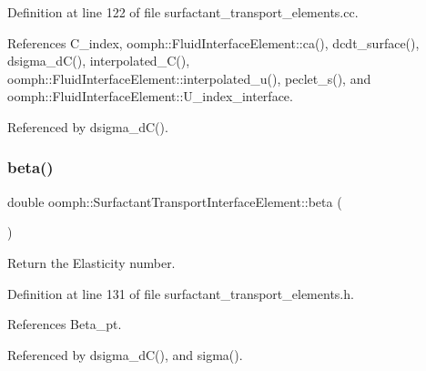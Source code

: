 Definition at line 122 of file surfactant\+\_\+transport\+\_\+elements.\+cc.



References C\+\_\+index, oomph\+::\+Fluid\+Interface\+Element\+::ca(), dcdt\+\_\+surface(), dsigma\+\_\+d\+C(), interpolated\+\_\+\+C(), oomph\+::\+Fluid\+Interface\+Element\+::interpolated\+\_\+u(), peclet\+\_\+s(), and oomph\+::\+Fluid\+Interface\+Element\+::\+U\+\_\+index\+\_\+interface.



Referenced by dsigma\+\_\+d\+C().

\mbox{\label{classoomph_1_1SurfactantTransportInterfaceElement_a79003d87401ad6106b8d10373ff12e73}} 
\subsubsection{\texorpdfstring{beta()}{beta()}}
{\footnotesize\ttfamily double oomph\+::\+Surfactant\+Transport\+Interface\+Element\+::beta (\begin{DoxyParamCaption}{ }\end{DoxyParamCaption})\hspace{0.3cm}{\ttfamily [inline]}}



Return the Elasticity number. 



Definition at line 131 of file surfactant\+\_\+transport\+\_\+elements.\+h.



References Beta\+\_\+pt.



Referenced by dsigma\+\_\+d\+C(), and sigma().

\mbox{\label{classoomph_1_1SurfactantTransportInterfaceElement_a7f64f64c3b5ad3abe6e09bb10a039298}} 
